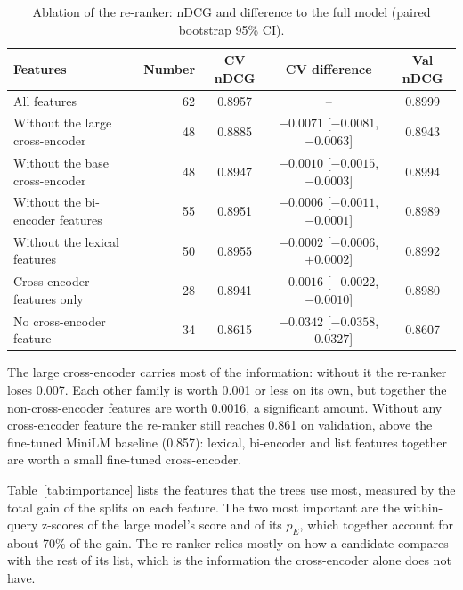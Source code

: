\documentclass[12pt,a4paper]{report}
\begin{document}
\begin{table}[H]
\centering
\caption{Ablation of the re-ranker: nDCG and difference to the full model (paired bootstrap 95\% CI).}
\label{tab:ablation}
\small
\begin{tabular}{@{}lrccc@{}}
\toprule
\textbf{Features} & \textbf{Number} & \textbf{CV nDCG} & \textbf{CV difference} & \textbf{Val nDCG} \\
\midrule
All features & 62 & 0.8957 & -- & 0.8999 \\
Without the large cross-encoder & 48 & 0.8885 & $-0.0071$ [$-0.0081$, $-0.0063$] & 0.8943 \\
Without the base cross-encoder & 48 & 0.8947 & $-0.0010$ [$-0.0015$, $-0.0003$] & 0.8994 \\
Without the bi-encoder features & 55 & 0.8951 & $-0.0006$ [$-0.0011$, $-0.0001$] & 0.8989 \\
Without the lexical features & 50 & 0.8955 & $-0.0002$ [$-0.0006$, $+0.0002$] & 0.8992 \\
Cross-encoder features only & 28 & 0.8941 & $-0.0016$ [$-0.0022$, $-0.0010$] & 0.8980 \\
No cross-encoder feature & 34 & 0.8615 & $-0.0342$ [$-0.0358$, $-0.0327$] & 0.8607 \\
\bottomrule
\end{tabular}
\end{table}

The large cross-encoder carries most of the information: without it the re-ranker loses 0.007. Each other family is worth 0.001 or less on its own, but together the non-cross-encoder features are worth 0.0016, a significant amount. Without any cross-encoder feature the re-ranker still reaches 0.861 on validation, above the fine-tuned MiniLM baseline (0.857): lexical, bi-encoder and list features together are worth a small fine-tuned cross-encoder.

Table~\ref{tab:importance} lists the features that the trees use most, measured by the total gain of the splits on each feature. The two most important are the within-query z-scores of the large model's score and of its $p_E$, which together account for about 70\% of the gain. The re-ranker relies mostly on how a candidate compares with the rest of its list, which is the information the cross-encoder alone does not have.
\end{document}
